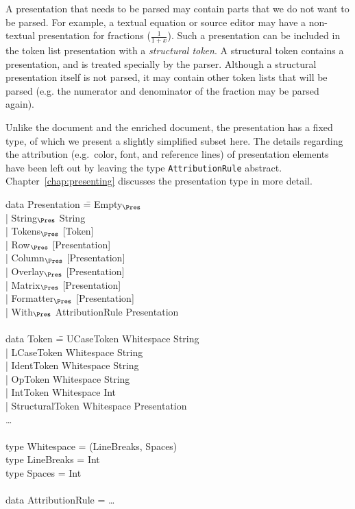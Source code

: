 A presentation that needs to be parsed may contain parts that we do not want to be parsed. For example, a textual equation or source editor may have a non-textual presentation for fractions ($\frac{1}{1+x}$). Such a presentation can be included in the token list presentation with a {\em structural token}. A structural token contains a presentation, and is treated specially by the parser. Although a structural presentation itself is not parsed, it may contain other token lists that will be parsed (e.g. the numerator and denominator of the fraction may be parsed again).

Unlike the document and the enriched document, the presentation has a fixed type, of which we present a slightly simplified subset here. The details regarding the attribution (e.g.\ color, font, and reference lines) of presentation elements have been left out by leaving the type \verb|AttributionRule| abstract. Chapter~\ref{chap:presenting} discusses the presentation type in more detail.

\noindent
\ttfamily
\begin{tabbing}
data Presentation \= = Empty$_{\Pres}$\\
                  \> | String$_{\Pres}$ String \\
                  \> | Tokens$_{\Pres}$ [Token]\\
                  \> | Row$_{\Pres}$ [Presentation]\\
                  \> | Column$_{\Pres}$ [Presentation]\\
                  \> | Overlay$_{\Pres}$ [Presentation]\\
                  \> | Matrix$_{\Pres}$ [Presentation]\\
                  \> | Formatter$_{\Pres}$ [Presentation]\\
                  \> | With$_{\Pres}$ AttributionRule Presentation\\
\\
data Token \= = UCaseToken Whitespace String\\
           \> | LCaseToken Whitespace String\\
           \> | IdentToken Whitespace String\\
           \> | OpToken Whitespace String\\
           \> | IntToken Whitespace Int\\
           \> | StructuralToken Whitespace Presentation\\
           \> \dots \\
\\
type Whitespace = (LineBreaks, Spaces)\\
type LineBreaks = Int\\
type Spaces = Int\\
\\
data AttributionRule = \dots\\
\end{tabbing}
\rmfamily


